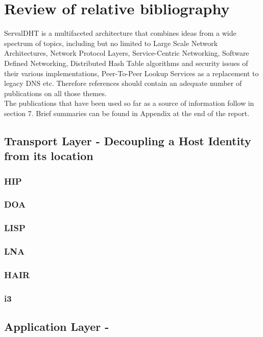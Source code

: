 \documentclass[12pt,a4paper,oneside]{article}
\begin{document}
\section{Review of relative bibliography}
\label{sec:reviewbibliography}
ServalDHT is a multifaceted architecture that combines ideas from a wide spectrum of topics, including but no limited to Large Scale Network Architectures, Network Protocol Layers, Service-Centric Networking, Software Defined Networking, Distributed Hash Table algorithms and security issues of their various implementations, Peer-To-Peer Lookup Services as a replacement to legacy DNS etc.
Therefore references should contain an adequate number of publications on all those themes.\\
\indent The publications that have been used so far as a source of information follow in section 7.
Brief summaries can be found in Appendix at the end of the report.
\subsection{Transport Layer - Decoupling a Host Identity from its location}
\subsubsection{HIP}
\subsubsection{DOA}
\subsubsection{LISP}
\subsubsection{LNA}
\subsubsection{HAIR}
\subsubsection{i3}

\subsection{Application Layer - }
\end{document}
